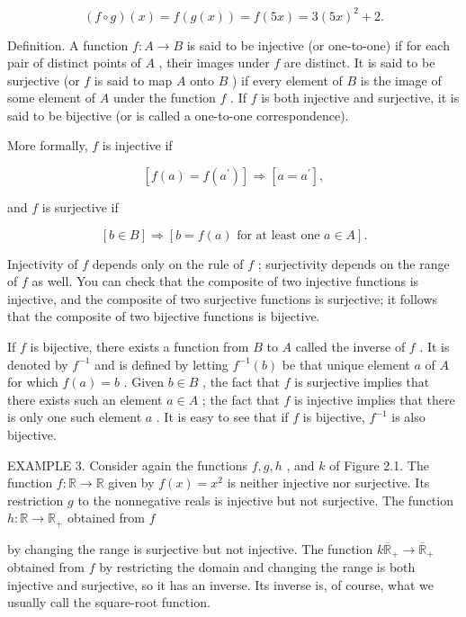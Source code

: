 \[
\left( {f \circ  g}\right) \left( x\right)  = f\left( {g\left( x\right) }\right)  = f\left( {5x}\right)  = 3{\left( 5x\right) }^{2} + 2.
\]

Definition. A function \(f : A \rightarrow  B\) is said to be injective (or one-to-one) if for each pair of distinct points of \(A\) , their images under \(f\) are distinct. It is said to be surjective (or \(f\) is said to map \(A\) onto \(B\) ) if every element of \(B\) is the image of some element of \(A\) under the function \(f\) . If \(f\) is both injective and surjective, it is said to be bijective (or is called a one-to-one correspondence).

More formally, \(f\) is injective if

\[
\left\lbrack  {f\left( a\right)  = f\left( {a}^{\prime }\right) }\right\rbrack   \Rightarrow  \left\lbrack  {a = {a}^{\prime }}\right\rbrack  ,
\]

and \(f\) is surjective if

\[
\left\lbrack  {b \in  B}\right\rbrack   \Rightarrow  \left\lbrack  {b = f\left( a\right) \text{ for at least one }a \in  A}\right\rbrack  .
\]

Injectivity of \(f\) depends only on the rule of \(f\) ; surjectivity depends on the range of \(f\) as well. You can check that the composite of two injective functions is injective, and the composite of two surjective functions is surjective; it follows that the composite of two bijective functions is bijective.

If \(f\) is bijective, there exists a function from \(B\) to \(A\) called the inverse of \(f\) . It is denoted by \({f}^{-1}\) and is defined by letting \({f}^{-1}\left( b\right)\) be that unique element \(a\) of \(A\) for which \(f\left( a\right)  = b\) . Given \(b \in  B\) , the fact that \(f\) is surjective implies that there exists such an element \(a \in  A\) ; the fact that \(f\) is injective implies that there is only one such element \(a\) . It is easy to see that if \(f\) is bijective, \({f}^{-1}\) is also bijective.

EXAMPLE 3. Consider again the functions \(f,g,h\) , and \(k\) of Figure 2.1. The function \(f : \mathbb{R} \rightarrow  \mathbb{R}\) given by \(f\left( x\right)  = {x}^{2}\) is neither injective nor surjective. Its restriction \(g\) to the nonnegative reals is injective but not surjective. The function \(h : \mathbb{R} \rightarrow  {\mathbb{R}}_{ + }\) obtained from \(f\)

by changing the range is surjective but not injective. The function \(k{\overline{\mathbb{R}}}_{ + } \rightarrow  {\overline{\mathbb{R}}}_{ + }\) obtained from \(f\) by restricting the domain and changing the range is both injective and surjective, so it has an inverse. Its inverse is, of course, what we usually call the square-root function.

